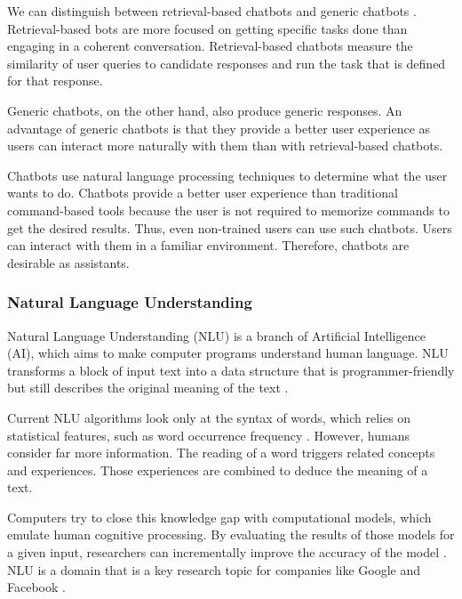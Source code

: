 
We can distinguish between retrieval-based chatbots and generic chatbots \cite{NLKl19,WWX*16}.
Retrieval-based bots are more focused on getting specific tasks done than engaging in a coherent conversation.
Retrieval-based chatbots measure the similarity of user queries to candidate responses and run the task that is defined for that response.

Generic chatbots, on the other hand, also produce generic responses.
An advantage of generic chatbots is that they provide a better user experience as users can interact more naturally with them than with retrieval-based chatbots.

Chatbots use natural language processing techniques to determine what the user wants to do.
Chatbots provide a better user experience \cite{CHW*17} than traditional command-based tools because the user is not required to memorize commands to get the desired results.
Thus, even non-trained users can use such chatbots.
Users can interact with them in a familiar environment. 
Therefore, chatbots are desirable as assistants.

\subsubsection{Natural Language Understanding}\label{sec:NLU}
Natural Language Understanding (NLU) is a branch of Artificial Intelligence (AI), which aims to make computer programs understand human language.
NLU transforms a block of input text into a data structure that is programmer-friendly but still describes the original meaning of the text \cite{CWB*11}.

Current NLU algorithms look only at the syntax of words, which relies on statistical features, such as word occurrence frequency \cite{CaWh14}.
However, humans consider far more information. The reading of a word triggers related concepts and experiences. Those experiences are combined to deduce the meaning of a text.

Computers try to close this knowledge gap with computational models, which emulate human cognitive processing.
By evaluating the results of those models for a given input, researchers can incrementally improve the accuracy of the model \cite{CaWh14}.
NLU is a domain that is a key research topic for companies like Google and Facebook \cite{AAA17}.


